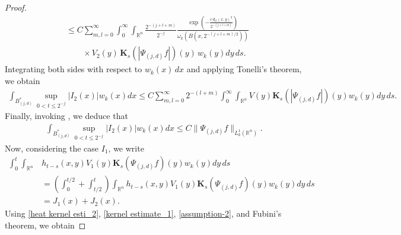 \documentclass[11pt, reqno]{amsproc}
\theoremstyle{definition}
\theoremstyle{remark}
\numberwithin{equation}{section}
\begin{document}
\begin{proof}
\begin{align*}
&\leq C \sum_{m,l=0}^\infty  
\int_0^\infty \int_{\mathbb{R}^n} 
\frac{2^{-(j+l+m)}}{2^{-j}} 
\frac{\exp\left(-\frac{c\, d_\mathcal{O}(x,y)^2}{2^{-(j+l+m)}}\right)}
{\omega_k(B(x,2^{-(j+l+m)/2}))} \\
&\quad \quad \times V_2(y)\, \mathbf{K}_s(|\Psi_{(j,d)}f|)(y)\, w_k(y)dy\, ds.
\end{align*}
Integrating both sides with respect to $w_k(x)\,dx$ and applying Tonelli's theorem, we obtain
\begin{align*}
    \int_{B_{(j,d)}^*}  \sup\limits_{0<t\leq 2^{-j}}|I_2(x)| w_k(x)dx 
    \leq C \sum_{m,l=0}^{\infty} 2^{-(l+m)} \int_0^\infty \int_{\mathbb{R}^n} V(y) \mathbf{K}_s(|\Psi_{(j,d)}f|)(y)w_k(y)dy\,ds.
\end{align*} Finally, invoking \cite[Lemma 16]{Hejna-2021}, we deduce that 
\begin{align*}
     \int_{B_{(j,d)}^*}  \sup\limits_{0<t\leq 2^{-j}}|I_2(x)| w_k(x)dx  \leq C \|\Psi_{(j,d)}f\|_{L_k^1(\mathbb{R}^n)}.
\end{align*}
Now, considering the case $I_1$, we write 
\begin{align*}
  \int_0^t \int_{\mathbb{R}^n}& h_{t-s}(x,y)V_1(y)\mathbf{K}_s(\Psi_{(j,d)}f)(y)w_k(y)dy\,ds  \\ & = \left(\int_0^{t/2} + \int_{t/2}^t\right)\int_{\mathbb{R}^n} h_{t-s}(x,y)V_1(y)\mathbf{K}_s(\Psi_{(j,d)}f)(y)w_k(y)dy\,ds\\
  & = J_1(x)+ J_2(x).
\end{align*} 
Using \eqref{heat kernel esti_2}, \eqref{kernel estimate_1}, \eqref{assumption-2}, and Fubini's theorem, we obtain 


\end{proof}
\end{document}
